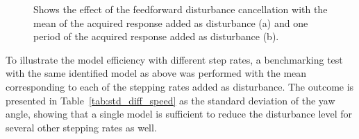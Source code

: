 \begin{figure}[h!]
  \centering %
  \qquad
  \caption{\label{fig:benchmark_dist} Shows the effect of the feedforward disturbance cancellation with the mean of the acquired response added as disturbance (a) and one period of the acquired response added as disturbance (b).}
\end{figure}
\FloatBarrier
To illustrate the model efficiency with different step rates, a benchmarking test with the same identified model as above was performed with the mean corresponding to each of the stepping rates added as disturbance. The outcome is presented in Table~\ref{tab:std_diff_speed} as the standard deviation of the yaw angle, showing that a single model is sufficient to reduce the disturbance level for several other stepping rates as well.
